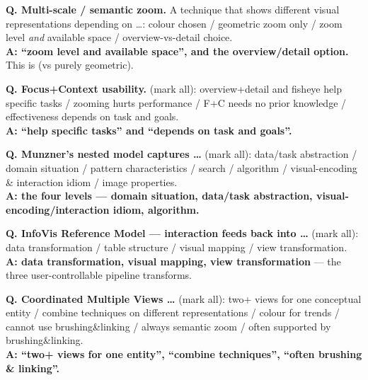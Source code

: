 \begin{qbox}
\textbf{Q. Multi-scale / semantic zoom.} A technique that shows different visual
representations depending on \dots: colour chosen / geometric zoom only / zoom
level \emph{and} available space / overview-vs-detail choice.\\
\textbf{A: ``zoom level and available space'', and the overview/detail option.}
This is  (vs purely geometric).

\medskip
\textbf{Q. Focus+Context usability.} (mark all): overview+detail and fisheye
help specific tasks / zooming hurts performance / F+C needs no prior knowledge /
effectiveness depends on task and goals.\\
\textbf{A: ``help specific tasks'' and ``depends on task and goals''.}

\medskip
\textbf{Q. Munzner's nested model captures \dots} (mark all):
data/task abstraction / domain situation / pattern characteristics / search /
algorithm / visual-encoding \& interaction idiom / image properties.\\
\textbf{A: the four levels --- domain situation, data/task abstraction,
visual-encoding/interaction idiom, algorithm.}

\medskip
\textbf{Q. InfoVis Reference Model --- interaction feeds back into \dots} (mark all):
data transformation / table structure / visual mapping / view transformation.\\
\textbf{A: data transformation, visual mapping, view transformation} --- the
three user-controllable pipeline transforms.

\medskip
\textbf{Q. Coordinated Multiple Views \dots} (mark all): two+ views for one
conceptual entity / combine techniques on different representations / colour for
trends / cannot use brushing\&linking / always semantic zoom / often supported by
brushing\&linking.\\
\textbf{A: ``two+ views for one entity'', ``combine techniques'', ``often
brushing \& linking''.}
\end{qbox}


